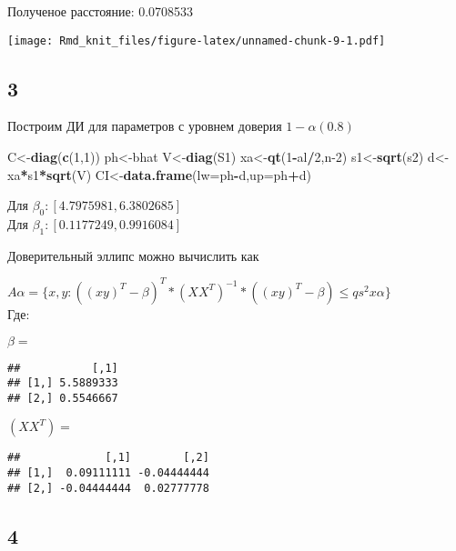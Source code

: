 \documentclass[]{article}
\newenvironment{Shaded}{\begin{snugshade}}{\end{snugshade}}
\newcommand{\DataTypeTok}[1]{\textcolor[rgb]{0.13,0.29,0.53}{#1}}
\newcommand{\DecValTok}[1]{\textcolor[rgb]{0.00,0.00,0.81}{#1}}
\newcommand{\KeywordTok}[1]{\textcolor[rgb]{0.13,0.29,0.53}{\textbf{#1}}}
\newcommand{\NormalTok}[1]{#1}
\newcommand{\OperatorTok}[1]{\textcolor[rgb]{0.81,0.36,0.00}{\textbf{#1}}}
\begin{document}
Полученое расстояние: 0.0708533

\texttt{[image: Rmd\_knit\_files/figure-latex/unnamed-chunk-9-1.pdf]}

\hypertarget{section-2}{%
\subsection{3}\label{section-2}}

Построим ДИ для параметров с уровнем доверия \(1-\alpha (0.8)\)

\begin{Shaded}
\begin{Highlighting}[]
\NormalTok{C<-}\KeywordTok{diag}\NormalTok{(}\KeywordTok{c}\NormalTok{(}\DecValTok{1}\NormalTok{,}\DecValTok{1}\NormalTok{))}
\NormalTok{ph<-bhat}
\NormalTok{V<-}\KeywordTok{diag}\NormalTok{(S1)}
\NormalTok{xa<-}\KeywordTok{qt}\NormalTok{(}\DecValTok{1}\OperatorTok{-}\NormalTok{al}\OperatorTok{/}\DecValTok{2}\NormalTok{,n}\DecValTok{-2}\NormalTok{)}
\NormalTok{s1<-}\KeywordTok{sqrt}\NormalTok{(s2)}
\NormalTok{d<-xa}\OperatorTok{*}\NormalTok{s1}\OperatorTok{*}\KeywordTok{sqrt}\NormalTok{(V)}
\NormalTok{CI<-}\KeywordTok{data.frame}\NormalTok{(}\DataTypeTok{lw=}\NormalTok{ph}\OperatorTok{-}\NormalTok{d,}\DataTypeTok{up=}\NormalTok{ph}\OperatorTok{+}\NormalTok{d)}
\end{Highlighting}
\end{Shaded}

Для \(\beta_0: [4.7975981,6.3802685]\)\\
Для \(\beta_1: [0.1177249,0.9916084]\)

Доверительный эллипс можно вычислить как

\(A\alpha=\{x,y:((xy)^T-\beta)^T*(XX^T)^{-1}*((xy)^T-\beta)\le qs^2x\alpha\}\)\\
Где:

\(\beta=\)

\begin{verbatim}
##           [,1]
## [1,] 5.5889333
## [2,] 0.5546667
\end{verbatim}

\((XX^T)=\)

\begin{verbatim}
##             [,1]        [,2]
## [1,]  0.09111111 -0.04444444
## [2,] -0.04444444  0.02777778
\end{verbatim}

\hypertarget{section-3}{%
\subsection{4}\label{section-3}}
\end{document}
